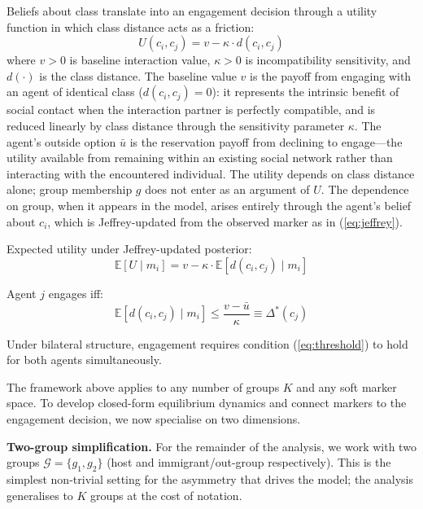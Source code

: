 \documentclass[12pt,a4paper]{article}
\theoremstyle{definition}
\numberwithin{proposition}{subsection}
\newcommand{\E}{\mathbb{E}}
\newcommand{\G}{\mathcal{G}}
\begin{document}
Beliefs about class translate into an engagement decision through a
utility function in which class distance acts as a friction:
\begin{equation}
  U(c_i, c_j) = v - \kappa \cdot d(c_i, c_j)
  \label{eq:utility}
\end{equation}
where $v > 0$ is baseline interaction value, $\kappa > 0$ is
incompatibility sensitivity, and $d(\cdot)$ is the class distance.
The baseline value $v$ is the payoff from engaging with an agent of
identical class ($d(c_i, c_j) = 0$): it represents the intrinsic
benefit of social contact when the interaction partner is perfectly
compatible, and is reduced linearly by class distance through the
sensitivity parameter $\kappa$.
The agent's outside option $\bar{u}$ is the reservation payoff from
declining to engage---the utility available from remaining within an
existing social network rather than interacting with the encountered
individual. The utility depends on class distance
alone; group membership $g$ does not enter as an argument of $U$.
The dependence on group, when it appears in the model, arises
entirely through the agent's belief about $c_i$, which is
Jeffrey-updated from the observed marker as in (\ref{eq:jeffrey}).

Expected utility under Jeffrey-updated posterior:
\begin{equation}
  \E[U \mid m_i] = v - \kappa \cdot \E[d(c_i, c_j) \mid m_i]
  \label{eq:exp-utility}
\end{equation}

Agent $j$ engages iff:
\begin{equation}
  \E[d(c_i, c_j) \mid m_i] \leq
  \frac{v - \bar{u}}{\kappa} \equiv \Delta^*(c_j)
  \label{eq:threshold}
\end{equation}

Under bilateral structure, engagement requires condition
(\ref{eq:threshold}) to hold for both agents simultaneously.

The framework above applies to any number of groups $K$ and any
soft marker space. To develop closed-form equilibrium dynamics and
connect markers to the engagement decision, we now specialise on
two dimensions.

\textbf{Two-group simplification.} For the remainder of the
analysis, we work with two groups $\G = \{g_1, g_2\}$ (host and
immigrant/out-group respectively). This is the simplest
non-trivial setting for the asymmetry that drives the model; the
analysis generalises to $K$ groups at the cost of notation.
\end{document}
